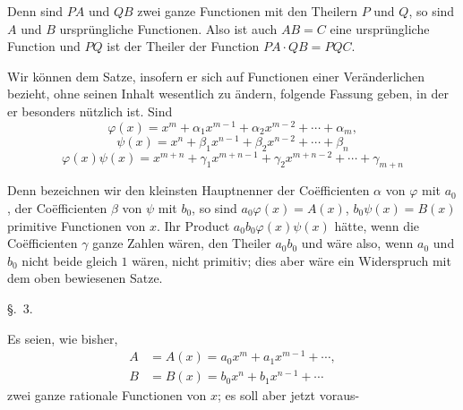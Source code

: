 
Denn sind $PA$ und $QB$ zwei ganze Functionen mit den Theilern $P$ und
$Q$, so sind $A$ und $B$ ursprüngliche Functionen. Also ist auch
$AB=C$ eine ursprüngliche Function und $PQ$ ist der Theiler der
Function $PA\cdot QB=PQC$.

Wir können dem Satze, insofern er sich auf Functionen einer
Veränderlichen bezieht, ohne seinen Inhalt wesentlich zu ändern,
folgende Fassung geben, in der er besonders nützlich ist. Sind
\[
 \varphi(x)=x^m+\alpha_1x^{m-1}+\alpha_2x^{m-2}+\cdots+\alpha_m,
\]
\[
 \psi(x)=x^n+\beta_1x^{n-1}+\beta_2x^{n-2}+\cdots+\beta_n
\]
\[
 \varphi(x)\psi(x)=x^{m+n}+\gamma_1x^{m+n-1}
 +\gamma_2x^{m+n-2}+\cdots+\gamma_{m+n}
\]

Denn bezeichnen wir den kleinsten Hauptnenner der Coëfficienten
$\alpha$ von $\varphi$ mit $a_0$, der Coëfficienten $\beta$ von $\psi$
mit $b_0$, so sind $a_0\varphi(x)=A(x)$,
$b_0\psi(x)=B(x)$ primitive Functionen von $x$. Ihr Product
$a_0b_0\varphi(x)\psi(x)$ hätte, wenn die Coëfficienten $\gamma$ ganze
Zahlen wären, den Theiler $a_0b_0$ und wäre also, wenn $a_0$ und $b_0$
nicht beide gleich $1$ wären, nicht primitiv; dies aber wäre ein
Widerspruch mit dem oben bewiesenen Satze.

\begin{center}
{\large \S.\ 3.}

\vspace{0.5em}
{\large{}}
\end{center}

Es seien, wie bisher,
\begin{equation}
\begin{aligned}
 A&=A(x)=a_0x^m+a_1x^{m-1}+\cdots,\\
 B&=B(x)=b_0x^n+b_1x^{n-1}+\cdots
\end{aligned}
\tag{1}
\end{equation}
zwei ganze rationale Functionen von $x$; es soll aber jetzt voraus-
